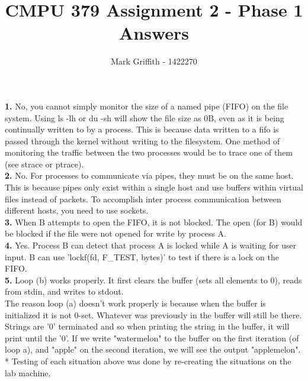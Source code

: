 \documentclass{article}
\begin{document}
\title{CMPU 379 Assignment 2 - Phase 1 Answers}
\author{Mark Griffith - 1422270}

\maketitle

\noindent
\textbf{1.} No, you cannot simply monitor the size
of a named pipe (FIFO) on the file system. Using
ls -lh or du -sh will show the file size as 0B,
even as it is being continually written to by
a process. This is because data written to a fifo is
passed through the kernel without writing to the filesystem.
One method of monitoring the traffic between the
two processes would be to trace one of them (see
strace or ptrace). \\

\noindent
\textbf{2.} No. For processes to communicate via
pipes, they must be on the same host. This
is because pipes only exist within a single
host and use buffers within virtual files
instead of packets. To accomplish inter
process communication between different hosts,
you need to use sockets. \\

\noindent
\textbf{3.} When B attempts to open the FIFO,
it is not blocked. The open (for B) would be blocked if the
file were not opened for write by process A.\\

\noindent
\textbf{4.} Yes. Process B can detect that
process A is locked while A is waiting for
user input. B can use 'lockf(fd, F\_TEST, bytes)'
to test if there is a lock on the FIFO. \\

\noindent
\textbf{5.}
Loop (b) works properly. It first clears the buffer (sets all
elements to 0), reads from stdin, and writes to stdout. \\

\noindent
The reason loop (a) doesn't work properly is because when the
buffer is initialized it is not 0-set. Whatever was
previously in the buffer will still be there. Strings are
'0' terminated and so when printing the string in the
buffer, it will print until the '0'. If we write
"watermelon" to the buffer on the first iteration (of loop a),
and "apple"
on the second iteration, we will see the output "applemelon". \\

\noindent
* Testing of each situation above was done by re-creating the
situations on the lab machine.
\end{document}
